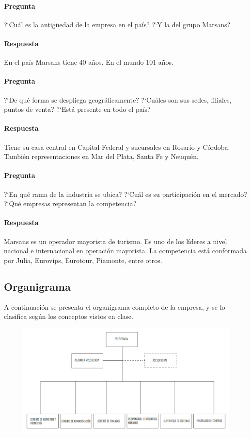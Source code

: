 \documentclass[12pt,a4paper,spanish]{article}
\begin{document}
	\paragraph{Pregunta}
	 ?`Cu\'al es la antig\"{u}edad de la empresa en el pa\'is?  ?`Y la del grupo Marsans?
	\paragraph{Respuesta}
	En el pa\'is Marsans tiene 40 a\~{n}os. En el mundo 101 a\~{n}os.

	\paragraph{Pregunta}
	 ?`De qu\'e forma se despliega geogr\'aficamente?  ?`Cu\'ales son sus sedes, filiales, puntos de venta?  ?`Est\'a presente en todo el pa\'is?
	\paragraph{Respuesta}
	Tiene su casa central en Capital Federal y sucursales en Rosario y C\'ordoba. Tambi\'en representaciones en Mar del Plata, Santa Fe y Neuqu\'en.

	\paragraph{Pregunta}
	 ?`En qu\'e rama de la industria se ubica?  ?`Cu\'al es su participaci\'on en el mercado?  ?`Qu\'e empresas representan la competencia?
	\paragraph{Respuesta}
	Marsans es un operador mayorista de turismo. Es uno de los l\'ideres a nivel nacional e internacional en operaci\'on mayorista. La competencia est\'a conformada por Julia, Eurovips, Eurotour, Piamonte, entre otros.

	\subsection{Organigrama}
	A continuaci\'on se presenta el organigrama completo de la empresa, y se lo clasifica seg\'un los conceptos vistos en clase.

	\begin{figure}[H]
	\centering
	\includegraphics[scale=0.45]{organigrama.png}
	\end{figure}
\end{document}
